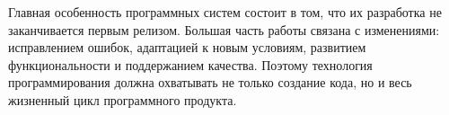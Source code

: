 \documentclass[12pt,a4paper]{article}
\begin{document}
Главная особенность программных систем состоит в том, что их разработка не заканчивается первым релизом. Большая часть работы связана с изменениями: исправлением ошибок, адаптацией к новым условиям, развитием функциональности и поддержанием качества. Поэтому технология программирования должна охватывать не только создание кода, но и весь жизненный цикл программного продукта.
\end{document}
